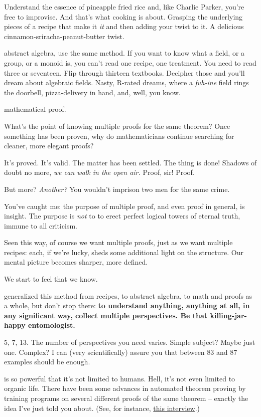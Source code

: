 Understand the essence of pineapple fried rice and, like Charlie Parker, you're free to improvise. And that's what cooking is about. Grasping the underlying pieces of a recipe
that make it \textit{it} and then adding your twist to it. A delicious
cinnamon-sriracha-peanut-butter twist.

 abstract algebra, use the same method. If you want to know what a field,
or a group, or a monoid is, you can't read one recipe, one treatment. You need
to read three or seventeen. Flip through thirteen textbooks. Decipher those and
you'll dream about algebraic fields. Nasty, R-rated dreams, where a
\textit{fuh-ine} field rings the doorbell, pizza-delivery in hand, and, well, you know.

 mathematical proof.

What's the point of knowing multiple proofs for the same theorem? Once something
has been proven, why do mathematicians continue searching for cleaner, more
elegant proofs?

It's proved. It's valid. The matter has been settled. The thing is done! Shadows
of doubt no more, \textit{we can walk in the open air.} Proof, sir! Proof.

But more? \textit{Another?} You wouldn't imprison two men for the same crime.

 You've caught me: the purpose of multiple proof, and even proof in
general, is insight. The purpose is \textit{not} to to erect perfect logical
towers of eternal truth, immune to all criticism.

Seen this way, of course we want multiple proofs, just as we want multiple
recipes: each, if we're lucky, sheds some additional light on the structure. Our mental
picture becomes sharper, more defined.

We start to feel that we know.

 generalized this method from recipes, to abstract algebra, to math and proofs
as a whole, but don't stop there: \textbf{to understand anything, anything at all, in
  any significant way, collect multiple perspectives. Be that killing-jar-happy
  entomologist.}

5, 7, 13. The number of perspectives you need varies. Simple subject? Maybe just
one. Complex? I can (very scientifically) assure you that between 83 and 87
examples should be enough.

 is so powerful that it's not limited to humans. Hell, it's
not even limited to organic life. There have been some advances in
automated theorem proving by training programs on several different proofs of
the same theorem -- exactly the idea I've just told you about. (See, for
instance, \href{http://intelligence.org/2013/12/21/josef-urban-on-machine-learning-and-automated-reasoning/}{this interview}.)

